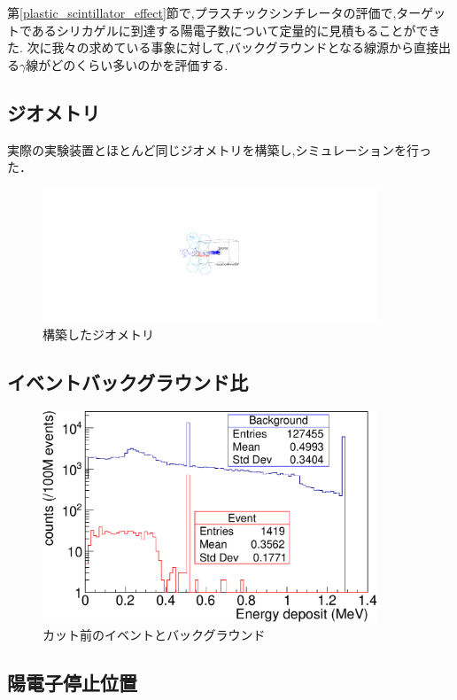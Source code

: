 第\ref{plastic_scintillator_effect}節で,プラスチックシンチレータの評価で,ターゲットであるシリカゲルに到達する陽電子数について定量的に見積もることができた.
次に我々の求めている事象に対して,バックグラウンドとなる線源から直接出る$\gamma$線がどのくらい多いのかを評価する.


\subsection{ジオメトリ}
実際の実験装置とほとんど同じジオメトリを構築し,シミュレーションを行った．

\begin{figure}[htbp]
	\centering
		\includegraphics[width=10cm]{img/test2_geometry.pdf}
	\caption{構築したジオメトリ}
	\label{test2_geometry}
\end{figure}

\subsection{イベントバックグラウンド比}

\begin{figure}[htbp]
	\centering
		\includegraphics[width=10cm]{fig/test2.pdf}
	\caption{カット前のイベントとバックグラウンド}
	\label{test2}
\end{figure}

\subsection{陽電子停止位置}

